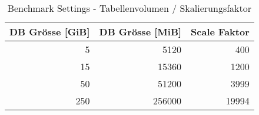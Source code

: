 \begin{table}[H]


\begin{tabular}{rrr}
\toprule
DB Grösse [GiB] & DB Grösse [MiB] & Scale Faktor \\
\midrule
5 & 5120 & 400 \\
15 & 15360 & 1200 \\
50 & 51200 & 3999 \\
250 & 256000 & 19994 \\
\bottomrule
\end{tabular}
\caption{Benchmark Settings - Tabellenvolumen / Skalierungsfaktor} \label{benchmarking_table_sizes}
\end{table}
